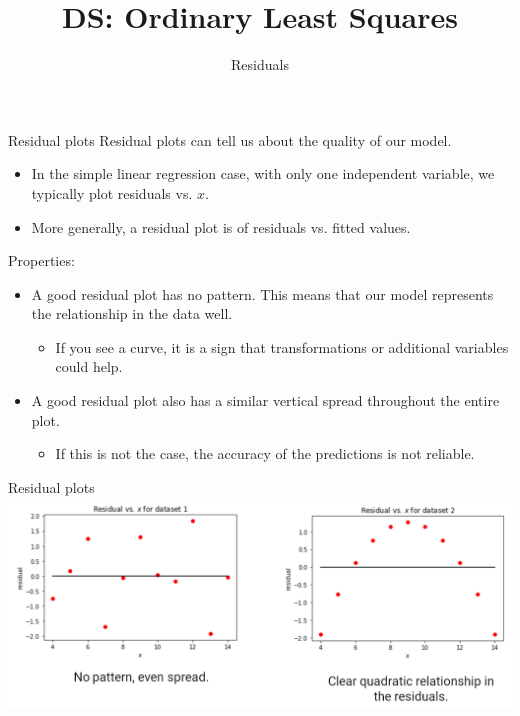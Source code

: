 \documentclass[aspectratio=169]{../latex_main/tntbeamer}  %
\title[Regression]{DS: Ordinary Least Squares}
\subtitle{Residuals}
\begin{document}
	
	\maketitle
	\begin{frame}{Residual plots}
	    Residual plots can tell us about the quality of our model.
	    \begin{itemize}
	        \item In the simple linear regression case, with only one independent variable, we typically plot residuals vs. $x$.
	        \item More generally, a residual plot is of residuals vs. fitted values.
	    \end{itemize}
	    Properties:
	    \begin{itemize}
	        \item A good residual plot has no pattern. This means that our model represents the relationship in the data well.
	        \begin{itemize}
	            \item \alert{If you see a curve, it is a sign that transformations or additional variables could help.}
	        \end{itemize}
	        \item A good residual plot also has a similar vertical spread throughout the entire plot.
	        \begin{itemize}
	            \item If this is not the case, the accuracy of the predictions is not reliable.
	        \end{itemize}
	    \end{itemize}
	\end{frame}
	
	
	\begin{frame}{Residual plots}
	    \centering
	    \includegraphics[scale=.4]{Bild11}
	\end{frame}
	
\end{document}
